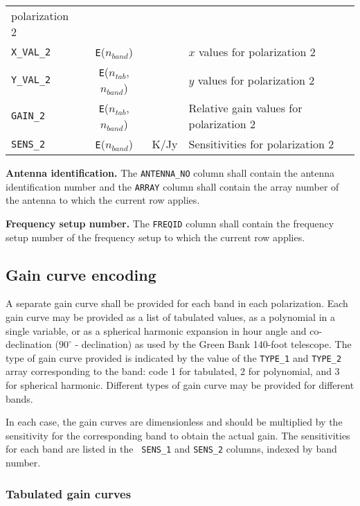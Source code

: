 \documentclass[twoside]{article}
\newcommand{\Hi}[1]{\textcolor{hicol}{#1}}
\newcommand{\nband}{$n_{band}$}
\newcommand{\ntab}{$n_{tab}$}
\begin{document}
\begin{center}
\begin{tabular}{lcll}
                                         polarization 2 \\
{\tt X\_VAL\_2}   & {\tt E}(\nband) &  & $x$ values for polarization 2 \\
{\tt Y\_VAL\_2}   & {\tt E}(\ntab,\nband) &  & $y$ values for polarization 2 \\
{\tt GAIN\_2}     & {\tt E}(\ntab,\nband) &  & Relative gain values
                                         for polarization 2 \\
{\tt SENS\_2}     & {\tt E}(\nband) & K/Jy& Sensitivities for
                                         polarization 2 \\
\end{tabular}
\end{center}

{\bf Antenna identification.}  The {\tt ANTENNA\_NO} column shall
contain the antenna identification number and the {\tt ARRAY} column
shall contain the array number of the antenna to which the current row
applies.

{\bf Frequency setup number.}  The {\tt FREQID} column shall contain
the frequency setup number of the frequency setup to which the current
row applies.

\subsection{Gain curve encoding}

A separate gain curve shall be provided for each band in each
polarization.  Each gain curve may be provided as a list of tabulated
values, as a polynomial in a single variable, or as a spherical
harmonic expansion in hour angle and co-declination ($90^{\circ}$ -
declination) as used by the Green Bank 140-foot telescope.  The type
of gain curve provided is indicated by the value of the {\tt TYPE\_1}
and {\tt TYPE\_2} array corresponding to the band\Hi{: code 1 for
tabulated, 2 for polynomial, and 3 for spherical harmonic.}  Different
types of gain curve may be provided for different bands.

In each case, the gain curves are dimensionless and should be
multiplied by the sensitivity for the corresponding band to obtain the
actual gain.  The sensitivities for each band are listed in the {\tt
  SENS\_1} and {\tt SENS\_2} columns, indexed by band number.

\subsubsection{Tabulated gain curves}
\end{document}
